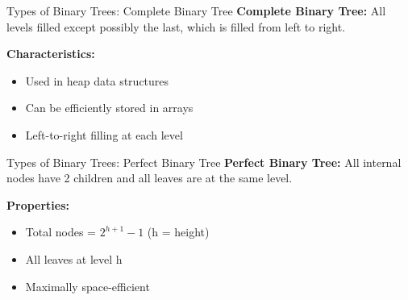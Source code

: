 \documentclass[aspectratio=169]{beamer}
\begin{document}
\begin{frame}{Types of Binary Trees: Complete Binary Tree}
  \textbf{Complete Binary Tree:} All levels filled except possibly the last, which is filled from left to right.

  \vspace{0.3cm}
  \begin{center}
  \end{center}

  \vspace{0.3cm}
  \textbf{Characteristics:}
  \begin{itemize}
    \item Used in heap data structures
    \item Can be efficiently stored in arrays
    \item Left-to-right filling at each level
  \end{itemize}
\end{frame}

\begin{frame}{Types of Binary Trees: Perfect Binary Tree}
  \textbf{Perfect Binary Tree:} All internal nodes have 2 children and all leaves are at the same level.

  \vspace{0.3cm}
  \begin{center}
  \end{center}

  \vspace{0.3cm}
  \textbf{Properties:}
  \begin{itemize}
    \item Total nodes = $2^{h+1} - 1$ (h = height)
    \item All leaves at level h
    \item Maximally space-efficient
  \end{itemize}
\end{frame}
\end{document}
